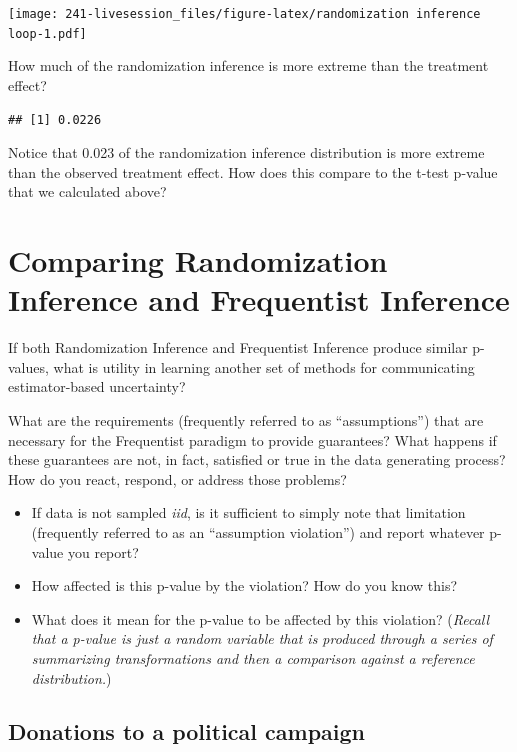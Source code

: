 \documentclass[
]{book}
\providecommand{\tightlist}{%
  \setlength{\itemsep}{0pt}\setlength{\parskip}{0pt}}
\begin{document}
\texttt{[image: 241-livesession\_files/figure-latex/randomization inference loop-1.pdf]}

How much of the randomization inference is more extreme than the
treatment effect?

\begin{verbatim}
## [1] 0.0226
\end{verbatim}

Notice that 0.023 of the randomization inference distribution is more
extreme than the observed treatment effect. How does this compare to the
t-test p-value that we calculated above?

\hypertarget{comparing-randomization-inference-and-frequentist-inference}{%
\section{Comparing Randomization Inference and Frequentist
Inference}\label{comparing-randomization-inference-and-frequentist-inference}}

If both Randomization Inference and Frequentist Inference produce
similar p-values, what is utility in learning another set of methods for
communicating estimator-based uncertainty?

What are the requirements (frequently referred to as ``assumptions'')
that are necessary for the Frequentist paradigm to provide guarantees?
What happens if these guarantees are not, in fact, satisfied or true in
the data generating process? How do you react, respond, or address those
problems?

\begin{itemize}
\tightlist
\item
  If data is not sampled \emph{iid}, is it sufficient to simply note
  that limitation (frequently referred to as an ``assumption
  violation'') and report whatever p-value you report?
\item
  How affected is this p-value by the violation? How do you know this?
\item
  What does it mean for the p-value to be affected by this violation?
  (\emph{Recall that a p-value is just a random variable that is
  produced through a series of summarizing transformations and then a
  comparison against a reference distribution.})
\end{itemize}

\hypertarget{donations-to-a-political-campaign}{%
\subsection{Donations to a political
campaign}\label{donations-to-a-political-campaign}}
\end{document}
